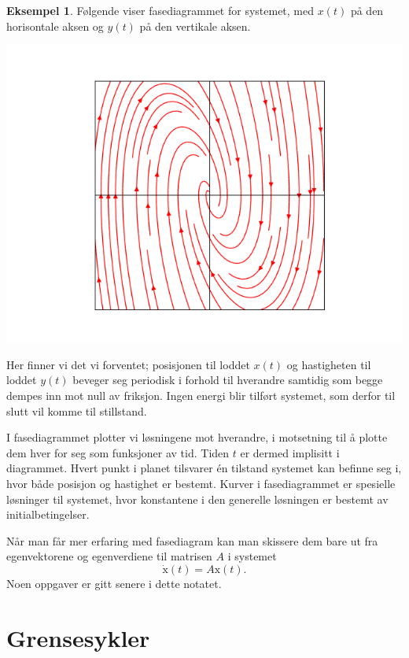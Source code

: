 \documentclass{article}
\theoremstyle{plain}
\theoremstyle{definition}
\newtheorem{eksempel}[teorem]{Eksempel}
\theoremstyle{remark}
\newcommand{\boldvec}[1]{\boldsymbol{\mathrm{#1}}}
\begin{document}
\begin{eksempel}
    Følgende viser fasediagrammet for systemet, med $x(t)$ på den horisontale aksen og $y(t)$ på den vertikale aksen.
    \begin{center}
        \includegraphics[scale=0.5]{phase_plane_1.png}
    \end{center}
    Her finner vi det vi forventet; posisjonen til loddet $x(t)$ og hastigheten til loddet $y(t)$ beveger seg periodisk i forhold til hverandre samtidig som begge dempes inn mot null av friksjon. Ingen energi blir tilført systemet, som derfor til slutt vil komme til stillstand.
\end{eksempel}

I fasediagrammet plotter vi løsningene mot hverandre, i motsetning til å plotte dem hver for seg som funksjoner av tid. Tiden $t$ er dermed implisitt i diagrammet. Hvert punkt i planet tilsvarer én tilstand systemet kan befinne seg i, hvor både posisjon og hastighet er bestemt. Kurver i fasediagrammet er spesielle løsninger til systemet, hvor konstantene i den generelle løsningen er bestemt av initialbetingelser.

Når man får mer erfaring med fasediagram kan man skissere dem bare ut fra egenvektorene og egenverdiene til matrisen $A$ i systemet
\begin{equation*}
    \boldvec{\dot{x}}(t) = A \boldvec{x}(t).
\end{equation*}
Noen oppgaver er gitt senere i dette notatet.


\section*{Grensesykler}
\end{document}
